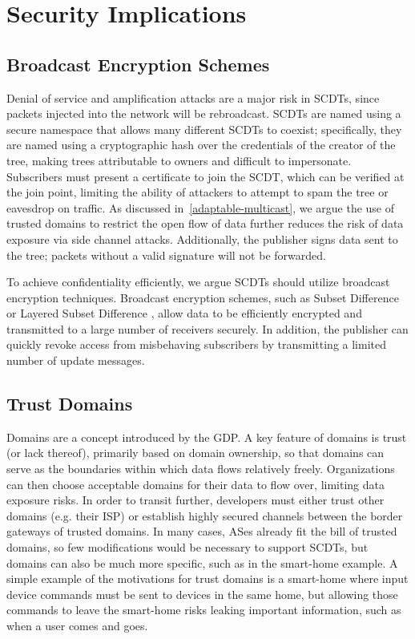 \section{Security Implications}
\subsection{Broadcast Encryption Schemes}
\label{encryption-security}

Denial of service and amplification attacks are a major risk in SCDTs, since packets injected into the network will be rebroadcast.  SCDTs are named using a secure namespace that allows many different SCDTs to coexist; specifically, they are named using a cryptographic hash over the credentials of the creator of the tree, making trees attributable to owners and difficult to impersonate.  Subscribers must present a certificate to join the SCDT, which can be verified at the join point, limiting the ability of attackers to attempt to spam the tree or eavesdrop on traffic.  As discussed in~\autoref{adaptable-multicast}, we argue the use of trusted domains to restrict the open flow of data further reduces the risk of data exposure via side channel attacks.  Additionally, the publisher signs data sent to the tree; packets without a valid signature will not be forwarded.  

To achieve confidentiality efficiently, we argue SCDTs should utilize broadcast encryption techniques.  Broadcast encryption \cite{broadcastenc} schemes, such as Subset Difference \cite{subset} or Layered Subset Difference \cite{lsd}, allow data to be efficiently encrypted and transmitted to a large number of receivers securely.  In addition, the publisher can quickly revoke access from misbehaving subscribers by transmitting a limited number of update messages.

\subsection{Trust Domains}
\label{domains}

Domains are a concept introduced by the GDP. A key feature of domains is trust (or lack thereof), primarily based
on domain ownership, so that domains can serve as the boundaries within which
data flows relatively freely.  Organizations can then choose acceptable
domains for their data to flow over, limiting data exposure risks. In order to transit further, developers must either trust other domains (e.g. their ISP) or establish highly secured channels between the border gateways of trusted domains. In many cases, ASes already fit the bill of trusted domains, so few modifications would be necessary to support SCDTs, but domains can also be much more specific, such as in the smart-home example. A simple example of the motivations for trust domains is a smart-home where input device commands must be sent to devices in the same home, but allowing those commands to leave the smart-home risks leaking important information, such as when a user comes and goes.  

